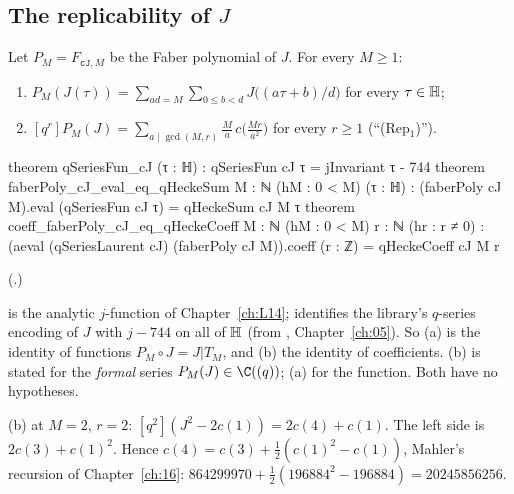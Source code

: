 \subsection{The replicability of \texorpdfstring{$J$}{J}}

\begin{theorem}[$J$ is replicable]\label{ch19:thm:Jrep}
Let $P_M=F_{\mathtt{cJ},M}$ be the Faber polynomial of $J$.  For every $M\ge1$:
\begin{enumerate}[label=(\alph*)]
\item $P_M(J(\tau))=\sum_{ad=M}\sum_{0\le b<d}J\bigl((a\tau+b)/d\bigr)$ for every $\tau\in\mathbb{H}$;
\item $[q^r]P_M(J)=\sum_{a\mid\gcd(M,r)}\frac Ma\,c\bigl(\frac{Mr}{a^2}\bigr)$ for every $r\ge1$ (``(Rep$_1$)'').
\end{enumerate}
\end{theorem}
\begin{leancode}
theorem qSeriesFun_cJ (τ : ℍ) : qSeriesFun cJ τ = jInvariant τ - 744
theorem faberPoly_cJ_eval_eq_qHeckeSum {M : ℕ} (hM : 0 < M) (τ : ℍ) :
    (faberPoly cJ M).eval (qSeriesFun cJ τ) = qHeckeSum cJ M τ
theorem coeff_faberPoly_cJ_eq_qHeckeCoeff {M : ℕ} (hM : 0 < M) {r : ℕ} (hr : r ≠ 0) :
    (aeval (qSeriesLaurent cJ) (faberPoly cJ M)).coeff (r : ℤ) = qHeckeCoeff cJ M r
\end{leancode}
(.)
\begin{dictionary}
 is the analytic $j$-function of Chapter~\ref{ch:L14};  identifies the library's
$q$-series encoding of $J$ with $j-744$ on all of $\mathbb{H}$ (from , Chapter~\ref{ch:05}).  So
(a) is the identity of functions $P_M\circ J=J|T_M$, and (b) the identity of coefficients.  (b) is stated for the
\emph{formal} series $P_M(J)\in\C((q))$; (a) for the function.  Both have no hypotheses.
\end{dictionary}
\begin{example}[$M=2$]\label{ch19:ex:J2}
(b) at $M=2$, $r=2$: $[q^2](J^2-2c(1))=2c(4)+c(1)$.  The left side is $2c(3)+c(1)^2$.  Hence $c(4)=c(3)+\frac12(c(1)^2-c(1))$,
Mahler's recursion of Chapter~\ref{ch:16}: $864299970+\frac12(196884^2-196884)=20245856256$.
\end{example}
